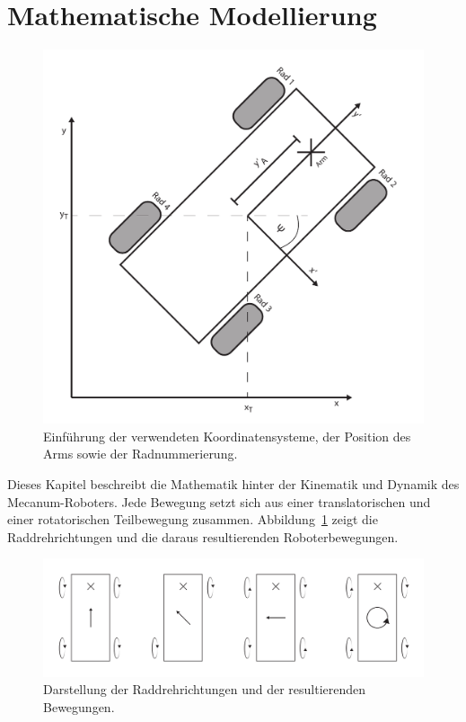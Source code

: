 

\section{Mathematische Modellierung}
\label{sec:Mathematische Modellierung}
\begin{figure}
    \centering
    \includegraphics[width=.8\textwidth]{Abbildungen/Koordinaten}
    \caption{Einführung der verwendeten Koordinatensysteme, der Position des Arms sowie der Radnummerierung.}
\end{figure}
Dieses Kapitel beschreibt die Mathematik hinter der Kinematik und Dynamik des Mecanum-Roboters.
Jede Bewegung setzt sich aus einer translatorischen und einer rotatorischen Teilbewegung zusammen. Abbildung~\ref{fig:Drehrichtung} zeigt die Raddrehrichtungen und die daraus resultierenden Roboterbewegungen.

\begin{figure}[H]
    \centering
    \includegraphics[width=.8\textwidth]{Abbildungen/Drehrichtung}
    \caption{Darstellung der Raddrehrichtungen und der resultierenden Bewegungen.}
    \label{fig:Drehrichtung}
\end{figure}

